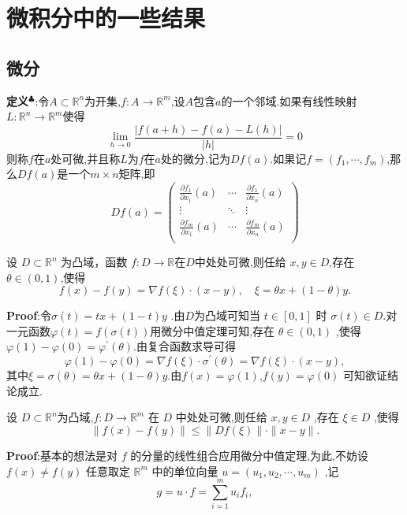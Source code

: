\section{微积分中的一些结果}
\subsection{微分}
\textbf{定义}$^\clubsuit $:令$A\subset\mathbb{R}^n$为开集,$f:A\to \mathbb{R}^m$,设$A$包含$a$的一个邻域.如果有线性映射$L:\mathbb{R}^n\to \mathbb{R}^m$使得
$$
\lim\limits_{h\to 0}\frac{|f(a+h)-f(a)-L(h)|}{|h|}=0
$$
则称$f$在$a$处可微,并且称$L$为$f$在$a$处的微分,记为$Df(a)$.如果记$f=(f_1,\cdots,f_m)$,那么$Df(a)$是一个$m\times n$矩阵,即
$$
Df(a)=
\begin{pmatrix}
    \frac{\partial f_1}{\partial x_1}(a) & \cdots & \frac{\partial f_1}{\partial x_n}(a)\\
    \vdots & \ddots & \vdots\\
    \frac{\partial f_m}{\partial x_1}(a) & \cdots & \frac{\partial f_m}{\partial x_n}(a)\\
\end{pmatrix}
$$
\begin{tcolorbox}[colback=KuangNei,colframe=BianKuang,title=\textbf{微分中值定理},sharpish corners]
    设 $D\subset\mathbb{R}^{n}$ 为凸域，函数 $f:D\rightarrow\mathbb{R}$在$D$中处处可微,则任给 $x,y\in D$,存在$\theta\in(0,1)$,使得  
$$
f(x)-f(y)=\nabla f(\xi)\cdot(x-y),\quad\xi=\theta x+(1-\theta)y.
$$
\end{tcolorbox}
\textbf{Proof}:令$\sigma(t)=t x+(1-t)y$ .由$D$为凸域可知当 $t\in[0,1]$ 时 $\sigma(t)\in D$.对一元函数$\varphi(t)=f(\sigma(t))$用微分中值定理可知,存在 $\theta\in(0,1)$ ,使得 $\varphi(1)-\varphi(0)=\varphi^{\prime}(\theta)$.由复合函数求导可得  
$$
\varphi(1)-\varphi(0)=\nabla f(\xi)\cdot\sigma^{\prime}(\theta)=\nabla f(\xi)\cdot(x-y),
$$
其中$\xi=\sigma(\theta)=\theta x+(1-\theta)y.$由$f(x)=\varphi(1)$,$f(y)=\varphi(0)$ 可知欲证结论成立. 
\begin{tcolorbox}[colback=KuangNei,colframe=BianKuang,title=\textbf{拟微分中值定理},sharpish corners]
设 $D\subset\mathbb{R}^{n}$为凸域,$f:D\rightarrow\mathbb{R}^{m}$ 在 $D$ 中处处可微,则任给 $x,y\in D$ ,存在 $\xi\in D$ ,使得 
$$
\|f(x)-f(y)\|\leqslant\|Df(\xi)\|\cdot\|x-y\|.
$$
\end{tcolorbox}
\textbf{Proof}:基本的想法是对 $f$ 的分量的线性组合应用微分中值定理,为此,不妨设 $f\left(x\right)\neq f\left(y\right)$ 任意取定 $\mathbb{R}^{m}$ 中的单位向量 $u=(u_{1},u_{2},\cdots,u_{m})$ ,记  
$$
g=u\cdot f=\sum_{i=1}^{m}u_{i}f_{i},
$$
